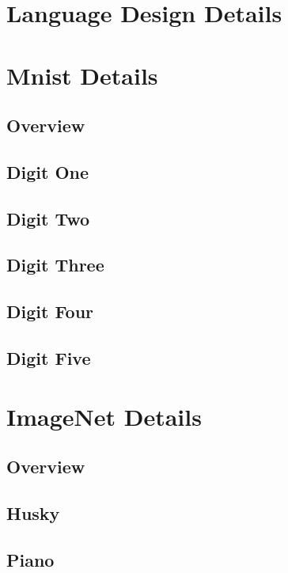 \documentclass[11pt]{article} 	%
\theoremstyle{definition}
\begin{document}
\section{Language Design Details}

\section{Mnist Details}

\subsection{Overview}


\subsection{Digit One}

\subsection{Digit Two}

\subsection{Digit Three}

\subsection{Digit Four}

\subsection{Digit Five}

\section{ImageNet Details}

\subsection{Overview}

\subsection{Husky}

\subsection{Piano}
\end{document}
